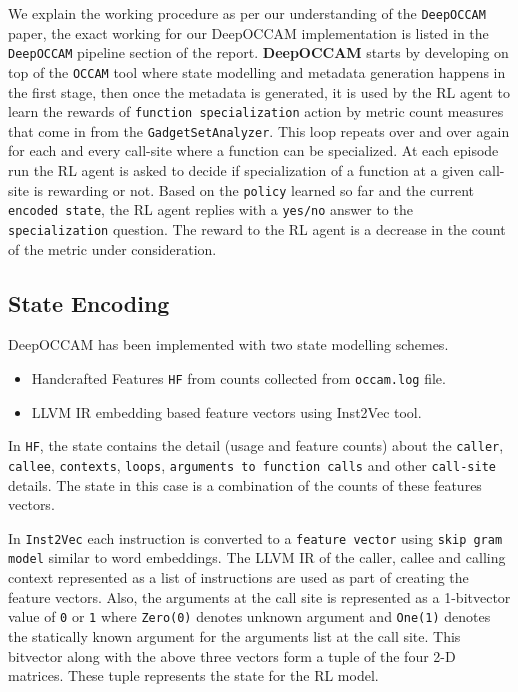 \documentclass{relatorio}
\begin{document}
We explain the working procedure as per our understanding of the \texttt{DeepOCCAM} paper, the exact working for our DeepOCCAM implementation is listed in the \texttt{DeepOCCAM} pipeline section of the report. \textbf{DeepOCCAM} starts by developing on top of the \texttt{OCCAM} tool where state modelling and metadata generation happens in the first stage, then once the metadata is  generated, it is used by the RL agent to learn the rewards of \texttt{function specialization} action by metric count measures that come in from the \texttt{GadgetSetAnalyzer}. This loop repeats over and over again for each and every call-site where a function can be specialized. At each episode run the RL agent is asked to decide if specialization of a function at a given call-site is rewarding or not. Based on the \texttt{policy} learned so far and the current \texttt{encoded state}, the RL agent replies with a \texttt{yes/no} answer to the \texttt{specialization} question. The reward to the RL agent is a decrease in the count of the metric under consideration. 

\subsection{State Encoding}%
\label{Tools}

DeepOCCAM has been implemented with two state modelling schemes. 

\begin{itemize}
	\item Handcrafted Features \texttt{HF} from counts collected from \texttt{occam.log} file.
\\ 
	\item LLVM IR embedding based feature vectors using Inst2Vec tool. \\
\end{itemize}

In \texttt{HF}, the state contains the detail (usage and feature counts) about the \texttt{caller}, \texttt{callee}, \texttt{contexts}, \texttt{loops}, \texttt{arguments to function calls} and other \texttt{call-site} details. The state in this case is a combination of the counts of these features vectors.

In \texttt{Inst2Vec} each instruction is converted to a \texttt{feature vector} using \texttt{skip gram model} similar to word embeddings. The LLVM IR of the caller, callee and calling context represented as a list of instructions are used as part of creating the feature vectors. Also, the arguments at the call site is represented as a 1-bitvector value of \texttt{0} or \texttt{1} where \texttt{Zero(0)} denotes unknown argument and \texttt{One(1)} denotes the statically known argument for the arguments list at the call site.
This bitvector along with the above three vectors form a tuple of the four 2-D matrices. These tuple represents the state for the RL model. 
\end{document}
